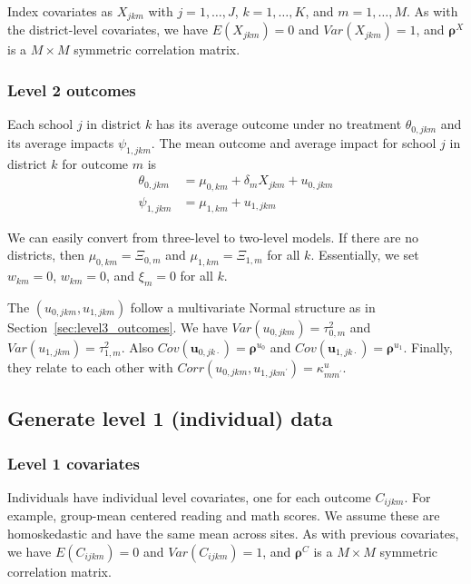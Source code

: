 \documentclass[12pt]{article}
\newcommand\mb[1]{\boldsymbol{#1}}
\begin{document}
Index covariates as $X_{jkm}$ with $j = 1, \ldots, J$, $k = 1, \ldots, K$, and $m = 1, \ldots, M$.
As with the district-level covariates, we have $E(X_{jkm}) = 0$ and $Var(X_{jkm}) = 1$, and $\mb{\rho}^X$ is a $M \times M$ symmetric correlation matrix.

\subsubsection{Level 2 outcomes}
\label{sec:level2_outcomes}

Each school $j$ in district $k$ has its average outcome under no treatment $\theta_{0,jkm}$ and its average impacts $\psi_{1,jkm}$.
The mean outcome and average impact for school $j$ in district $k$ for outcome $m$ is
\begin{align}
\theta_{0,jkm} 	&= \mu_{0,km} + \delta_{m} X_{jkm} + u_{0,jkm}  \\
\psi_{1,jkm} 		&= \mu_{1,km} + u_{1,jkm}
\end{align}

We can easily convert from three-level to two-level models.
If there are no districts, then $\mu_{0,km} = \Xi_{0,m}$ and $\mu_{1,km} = \Xi_{1,m}$ for all $k$. Essentially, we set $w_{km} = 0$, $w_{km} = 0$, and $\xi_m = 0$ for all $k$. 

The $(u_{0,jkm}, u_{1,jkm})$ follow a multivariate Normal structure as in Section~\ref{sec:level3_outcomes}.
We have $Var(u_{0,jkm}) = \tau^2_{0,m}$ and $Var(u_{1,jkm}) = \tau^2_{1,m}$.  Also $Cov(\mb{u}_{0,jk\cdot}) = \mb{\rho}^{u_0}$ and $Cov(\mb{u}_{1,jk\cdot}) = \mb{\rho}^{u_1}$. Finally, they relate to each other with $Corr(u_{0,jkm}, u_{1,jkm^\prime}) = \kappa^{u}_{mm^\prime}$.


\subsection{Generate level 1 (individual) data}

\subsubsection{Level 1 covariates}

Individuals have individual level covariates, one for each outcome $C_{ijkm}$.
For example, group-mean centered reading and math scores.
We assume these are homoskedastic and have the same mean across sites.
As with previous covariates, we have $E(C_{ijkm}) = 0$ and $Var(C_{ijkm}) = 1$, and $\mb{\rho}^C$ is a $M \times M$ symmetric correlation matrix.
\end{document}
